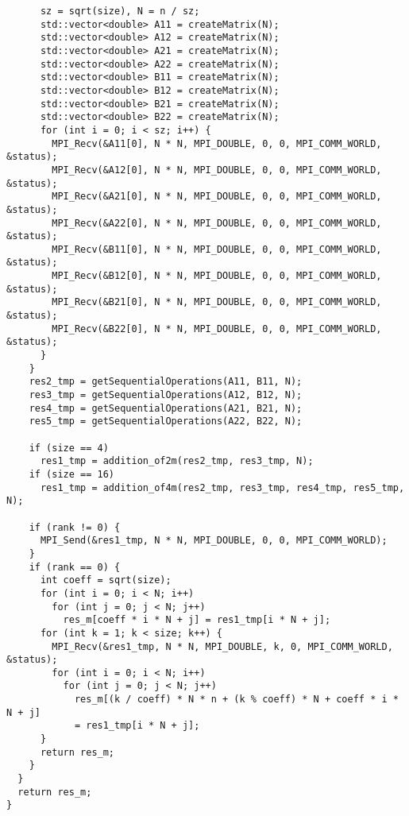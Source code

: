 \documentclass{report}
\begin{document}
\begin{lstlisting}
      sz = sqrt(size), N = n / sz;
      std::vector<double> A11 = createMatrix(N);
      std::vector<double> A12 = createMatrix(N);
      std::vector<double> A21 = createMatrix(N);
      std::vector<double> A22 = createMatrix(N);
      std::vector<double> B11 = createMatrix(N);
      std::vector<double> B12 = createMatrix(N);
      std::vector<double> B21 = createMatrix(N);
      std::vector<double> B22 = createMatrix(N);
      for (int i = 0; i < sz; i++) {
        MPI_Recv(&A11[0], N * N, MPI_DOUBLE, 0, 0, MPI_COMM_WORLD, &status);
        MPI_Recv(&A12[0], N * N, MPI_DOUBLE, 0, 0, MPI_COMM_WORLD, &status);
        MPI_Recv(&A21[0], N * N, MPI_DOUBLE, 0, 0, MPI_COMM_WORLD, &status);
        MPI_Recv(&A22[0], N * N, MPI_DOUBLE, 0, 0, MPI_COMM_WORLD, &status);
        MPI_Recv(&B11[0], N * N, MPI_DOUBLE, 0, 0, MPI_COMM_WORLD, &status);
        MPI_Recv(&B12[0], N * N, MPI_DOUBLE, 0, 0, MPI_COMM_WORLD, &status);
        MPI_Recv(&B21[0], N * N, MPI_DOUBLE, 0, 0, MPI_COMM_WORLD, &status);
        MPI_Recv(&B22[0], N * N, MPI_DOUBLE, 0, 0, MPI_COMM_WORLD, &status);
      }
    }
    res2_tmp = getSequentialOperations(A11, B11, N);
    res3_tmp = getSequentialOperations(A12, B12, N);
    res4_tmp = getSequentialOperations(A21, B21, N);
    res5_tmp = getSequentialOperations(A22, B22, N);

    if (size == 4)
      res1_tmp = addition_of2m(res2_tmp, res3_tmp, N);
    if (size == 16)
      res1_tmp = addition_of4m(res2_tmp, res3_tmp, res4_tmp, res5_tmp, N);

    if (rank != 0) {
      MPI_Send(&res1_tmp, N * N, MPI_DOUBLE, 0, 0, MPI_COMM_WORLD);
    }
    if (rank == 0) {
      int coeff = sqrt(size);
      for (int i = 0; i < N; i++)
        for (int j = 0; j < N; j++)
          res_m[coeff * i * N + j] = res1_tmp[i * N + j];
      for (int k = 1; k < size; k++) {
        MPI_Recv(&res1_tmp, N * N, MPI_DOUBLE, k, 0, MPI_COMM_WORLD, &status);
        for (int i = 0; i < N; i++)
          for (int j = 0; j < N; j++)
            res_m[(k / coeff) * N * n + (k % coeff) * N + coeff * i * N + j]
            = res1_tmp[i * N + j];
      }
      return res_m;
    }
  }
  return res_m;
}
\end{lstlisting}
\end{document}
